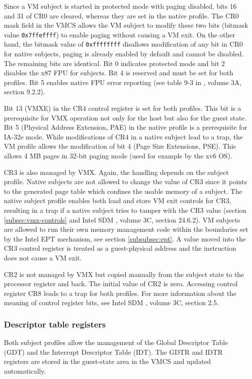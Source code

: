 Since a VM subject is started in protected mode with paging disabled, bits 16
and 31 of CR0 are cleared, whereas they are set in the native profile. The CR0
mask field in the VMCS allows the VM subject to modify these two bits (bitmask
value \texttt{0x7ffeffff}) to enable paging without causing a VM exit. On the
other hand, the bitmask value of \texttt{0xffffffff} disallows modification of
any bit in CR0 for native subjects, paging is already enabled by default and
cannot be disabled. The remaining bits are identical. Bit 0 indicates protected
mode and bit 2 disables the x87 FPU for subjects. Bit 4 is reserved and must be
set for both profiles. Bit 5 enables native FPU error reporting (see table 9-3
in \cite{IntelSDM}, volume 3A, section 9.2.2).

Bit 13 (VMXE) in the CR4 control register is set for both profiles. This bit is
a prerequisite for VMX operation not only for the host but also for the guest
state. Bit 5 (Physical Address Extension, PAE) in the native profile
is a prerequisite for IA-32e mode. While modifications of CR4 in a native
subject lead to a trap, the VM profile allows the modification of bit 4 (Page
Size Extensions, PSE). This allows 4 MB pages in 32-bit paging mode
(used for example by the xv6 OS).

CR3 is also managed by VMX. Again, the handling depends on the subject profile.
Native subjects are not allowed to change the value of CR3 since it points to
the generated page table which confines the usable memory of a subject. The
native subject profile enables both load and store VM exit controls for CR3,
resulting in a trap if a native subject tries to tamper with the CR3 value
(section \ref{subsec:vmx-controls} and Intel SDM \cite{IntelSDM}, volume 3C,
section 24.6.2). VM subjects are allowed to run their own memory management
code within the boundaries set by the Intel EPT mechanism, see section
\ref{subsubsec:ept}. A value moved into the CR3 control register is treated as
a guest-physical address and the instruction does not cause a VM exit.

CR2 is not managed by VMX but copied manually from the subject state to the
processor register and back. The initial value of CR2 is zero. Accessing
control register CR8 leads to a trap for both profiles. For more information
about the meaning of control register bits, see Intel SDM \cite{IntelSDM},
volume 3C, section 2.5.

\subsubsection{Descriptor table registers}
Both subject profiles allow the management of the Global Descriptor Table
(GDT) and the Interrupt Descriptor Table (IDT). The GDTR
and IDTR registers are stored in the guest-state area in the VMCS and updated
automatically.

